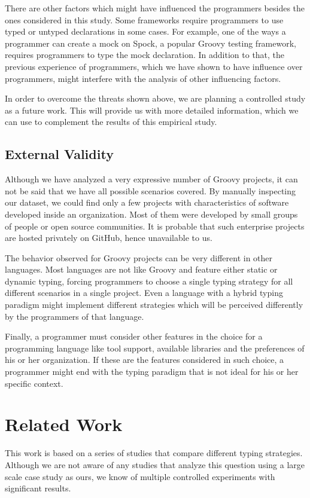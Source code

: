\documentclass[preprint]{sigplanconf}
\begin{document}
There are other factors which might have influenced the programmers besides the ones considered in this study.
Some frameworks require programmers to use typed or untyped declarations in some cases.
For example, one of the ways a programmer can create a mock on Spock, a popular Groovy testing framework, requires programmers to type the mock declaration.
In addition to that, the previous experience of programmers, which we have shown to have influence over programmers, might interfere with the analysis of other influencing factors.

In order to overcome the threats shown above, we are planning a controlled study as a future work.
This will provide us with more detailed information, which we can use to complement the results of this empirical study.

\subsection*{External Validity}
Although we have analyzed a very expressive number of Groovy projects, it can not be said that we have all possible scenarios covered.
By manually inspecting our dataset, we could find only a few projects with characteristics of software developed inside an organization.
Most of them were developed by small groups of people or open source communities.
It is probable that such enterprise projects are hosted privately on GitHub, hence unavailable to us.

The behavior observed for Groovy projects can be very different in other languages.
Most languages are not like Groovy and feature either static or dynamic typing, forcing programmers to choose a single typing strategy for all different scenarios in a single project.
Even a language with a hybrid typing paradigm might implement different strategies which will be perceived differently by the programmers of that language.

Finally, a programmer must consider other features in the choice for a programming language like tool support, available libraries and the preferences of his or her organization.
If these are the features considered in such choice, a programmer might end with the typing paradigm that is not ideal for his or her specific context.











%
%
\section{Related Work\label{related}}
This work is based on a series of studies that compare different typing strategies.
Although we are not aware of any studies that analyze this question using a large scale case study as ours, we know of multiple controlled experiments with significant results.
\end{document}
